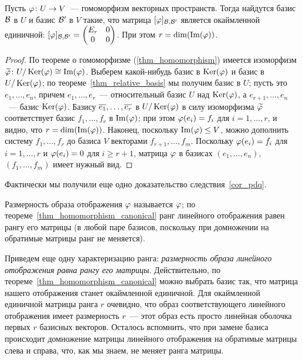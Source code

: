 \begin{theorem}\label{thm_homomorphism_canonical}
Пусть $\varphi\colon U\to V$~--- гомоморфизм векторных пространств. Тогда
найдутся базис $\mathcal B$ в $U$ и базис $\mathcal B'$ в $V$ такие, что матрица
$[\varphi]_{\mathcal B,\mathcal B'}$ является окаймленной единичной:
$[\varphi]_{\mathcal B,\mathcal B'} = \begin{pmatrix}E_r & 0\\0&0\end{pmatrix}$.
При этом $r=\dim(\operatorname{Im}(\varphi))$.
\end{theorem}
\begin{proof}
По теореме о гомоморфизме (\ref{thm_homomorphism}) имеется изоморфизм
$\widetilde{\varphi}\colon U/\operatorname{Ker}(\varphi)\cong\operatorname{Im}(\varphi)$.
Выберем какой-нибудь базис в $\operatorname{Ker}(\varphi)$ и базис в $U/\operatorname{Ker}(\varphi)$; по
теореме~\ref{thm_relative_basis} мы получим базис в $U$; пусть это
$e_1,\dots,e_n$,
причем $e_1,\dots,e_r$~--- относительный базис $U$ над $\operatorname{Ker}(\varphi)$, а
$e_{r+1},\dots,e_n$~--- базис $\operatorname{Ker}(\varphi)$.
Базису $\overline{e_1},\dots,\overline{e_r}$ в $U/\operatorname{Ker}(\varphi)$ в силу
изоморфизма $\widetilde{\varphi}$ соответствует базис $f_1,\dots,f_r$ в
$\operatorname{Im}(\varphi)$; при этом $\varphi(e_i)=f_i$ для $i=1,\dots,r$, и видно, что
$r=\dim(\operatorname{Im}(\varphi))$.
Наконец, поскольку $\operatorname{Im}(\varphi)\leq V$, можно дополнить систему
$f_1,\dots,f_r$ до базиса $V$ векторами $f_{r+1},\dots,f_m$.
Поскольку $\varphi(e_i)=f_i$ для $i=1,\dots,r$ и $\varphi(e_i)=0$ для $i\geq
r+1$, матрица $\varphi$ в базисах $(e_1,\dots,e_n)$, $(f_1,\dots,f_m)$
имеет нужный вид.
\end{proof}

Фактически мы получили еще одно доказательство
следствия~\ref{cor_pdq}.
\begin{remark}\label{rem_rank_homomorphism}
Размерность образа отображения $\varphi$ называется
 $\varphi$; по
теореме~\ref{thm_homomorphism_canonical} ранг линейного отображения
равен рангу его матрицы (в любой паре базисов, поскольку при
домножении на обратимые матрицы ранг не меняется).
\end{remark}

\begin{remark}\label{rem:rank-is-dim-im}
Приведем еще одну характеризацию ранга: {\em размерность образа
линейного отображения равна рангу его матрицы}. Действительно,
по теореме~\ref{thm_homomorphism_canonical} можно выбрать базис так,
что матрица нашего отображения станет окаймленной единичной.
Для окаймленной единичной матрицы ранга $r$ очевидно, что образ
соответствующего линейного отображения имеет размерность $r$~---
этот образ есть просто линейная оболочка первых $r$ базисных векторов.
Осталось вспомнить, что при замене базиса происходит домножение
матрицы линейного отображения на обратимые матрицы слева и справа,
что, как мы знаем, не меняет ранга матрицы. 
\end{remark}

